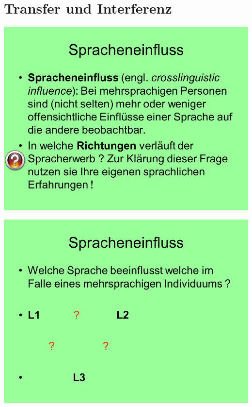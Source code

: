 \documentclass[
  letterpaper,
]{scrbook}
\begin{document}
\hypertarget{transfer-und-interferenz}{%
\section{Transfer und Interferenz}\label{transfer-und-interferenz}}

\includegraphics[width=1\textwidth,height=\textheight]{./pictures/02_Spracheneinfluss_Sprachentrennung/Diapozitiv2.PNG}

\includegraphics[width=1\textwidth,height=\textheight]{./pictures/02_Spracheneinfluss_Sprachentrennung/Diapozitiv3.PNG}
\end{document}

